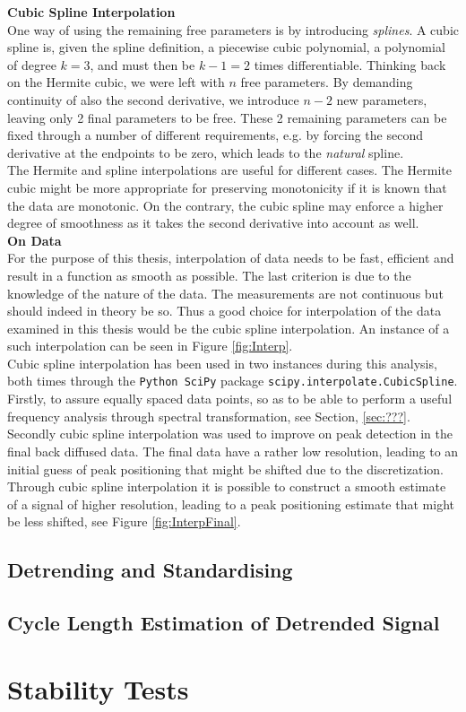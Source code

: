 \documentclass[../../CompleteThesis/Complete_1stDraft]{subfiles}
\begin{document}
\indent \textbf{Cubic Spline Interpolation}\\
One way of using the remaining free parameters is by introducing \textit{splines}. A cubic spline is, given the spline definition, a piecewise cubic polynomial, a polynomial of degree $k=3$, and must then be $k-1 = 2$ times differentiable. Thinking back on the Hermite cubic, we were left with $n$ free parameters. By demanding continuity of also the second derivative, we introduce $n-2$ new parameters, leaving only 2 final parameters to be free. These 2 remaining parameters can be fixed through a number of different requirements, e.g. by forcing the second derivative at the endpoints to be zero, which leads to the \textit{natural} spline.\\
The Hermite and spline interpolations are useful for different cases. The Hermite cubic might be more appropriate for preserving monotonicity if it is known that the data are monotonic. On the contrary, the cubic spline may enforce a higher degree of smoothness as it takes the second derivative into account as well.\\
\indent \textbf{On Data}\\
For the purpose of this thesis, interpolation of data needs to be fast, efficient and result in a function as smooth as possible. The last criterion is due to the knowledge of the nature of the data. The measurements are not continuous but should indeed in theory be so. Thus a good choice for interpolation of the data examined in this thesis would be the cubic spline interpolation. An instance of a such interpolation can be seen in Figure \ref{fig:Interp}.\\
Cubic spline interpolation has been used in two instances during this analysis, both times through the \lstinline[language=Python]|Python SciPy| package \lstinline[language=Python]|scipy.interpolate.CubicSpline|. Firstly, to assure equally spaced data points, so as to be able to perform a useful frequency analysis through spectral transformation, see Section, \ref{sec:???}. Secondly cubic spline interpolation was used to improve on peak detection in the final back diffused data. The final data have a rather low resolution, leading to an initial guess of peak positioning that might be shifted due to the discretization. Through cubic spline interpolation it is possible to construct a smooth estimate of a signal of higher resolution, leading to a peak positioning estimate that might be less shifted, see Figure \ref{fig:InterpFinal}.

\subsection[Standardisation]{Detrending and Standardising}
\subsection[Cycle Length Estimation][Cycle Length Estimation]{Cycle Length Estimation of Detrended Signal}

\section[Stability Tests]{Stability Tests}

	
	
\end{document}
